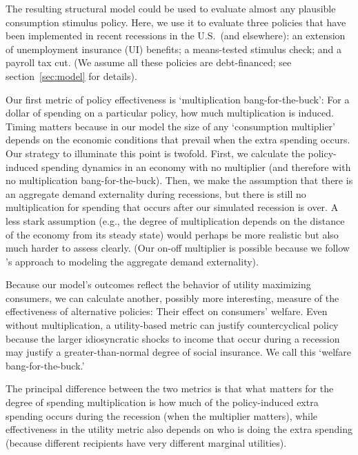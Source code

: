 \documentclass[../HAFiscal]{subfiles}
\begin{document}
The resulting structural model could be used to evaluate almost any plausible consumption stimulus policy.  Here, we use it to evaluate three policies that have been implemented in recent recessions in the U.S.\ (and elsewhere): an extension of unemployment insurance (UI) benefits; a means-tested stimulus check; and a payroll tax cut.  (We assume all these policies are debt-financed; see section~\ref{sec:model} for details).  %

Our first metric of policy effectiveness is `multiplication bang-for-the-buck': For a dollar of spending on a particular policy, how much multiplication is induced.  Timing matters because in our model the size of any `consumption multiplier' depends on the economic conditions that prevail when the extra spending occurs.  Our strategy to illuminate this point is twofold.  First, we calculate the policy-induced spending dynamics in an economy with no multiplier (and therefore with no multiplication bang-for-the-buck).  Then, we make the assumption that there is an aggregate demand externality during recessions, but there is still no multiplication for spending that occurs after our simulated recession is over.  A less stark assumption (e.g., the degree of multiplication depends on the distance of the economy from its steady state) would perhaps be more realistic but also much harder to assess clearly.  (Our on-off multiplier is possible because we follow \cite{kmpHandbook2016}'s approach to modeling the aggregate demand externality).  %

Because our model's outcomes reflect the behavior of utility maximizing consumers, we can calculate another, possibly more interesting, measure of the effectiveness of alternative policies:  Their effect on consumers' welfare.  Even without multiplication, a utility-based metric can justify countercyclical policy because the larger idiosyncratic shocks to income that occur during a recession may justify a greater-than-normal degree of social insurance.  We call this `welfare bang-for-the-buck.'

The principal difference between the two metrics is that what matters for the degree of spending multiplication is how much of the policy-induced extra spending occurs during the recession (when the multiplier matters), while effectiveness in the utility metric also depends on who is doing the extra spending (because different recipients have very different marginal utilities).
\end{document}
